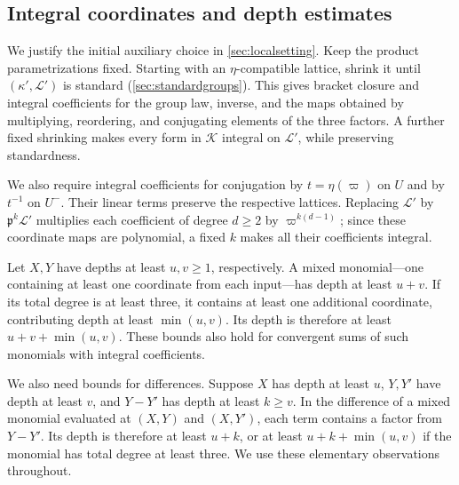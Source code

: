 \documentclass[11pt,reqno]{amsart}
\numberwithin{equation}{section}
\theoremstyle{plain}
\theoremstyle{definition}
\theoremstyle{remark}
\theoremstyle{plain}
\newcommand{\pp}{\mathfrak{p}}   %
\newcommand{\Lat}{\mathcal{L}}   %
\newcommand{\g}{\mathfrak{g}}    %
\newcommand{\etacompat}{$\eta$-compatible}
\begin{document}
\subsection{Integral coordinates and depth estimates}\label{sec:estimates}
We justify the initial auxiliary choice in \cref{sec:localsetting}.
Keep the product parametrizations fixed. Starting with an
\etacompat{} lattice, shrink it until $(\kappa',\Lat')$ is standard
(\cref{sec:standardgroups}). This gives bracket closure and integral
coefficients for the group law, inverse, and the maps obtained by
multiplying, reordering, and conjugating elements of the three factors.
A further fixed shrinking makes every form in $\mathcal K$ integral
on $\Lat'$, while preserving standardness.

We also require integral coefficients for conjugation by
$t=\eta(\varpi)$ on $U$ and by $t^{-1}$ on $U^-$.
Their linear terms preserve the respective lattices.
Replacing $\Lat'$ by $\pp^k\Lat'$ multiplies each coefficient of
degree $d\ge2$ by $\varpi^{k(d-1)}$; since these coordinate maps
are polynomial, a fixed $k$ makes all their coefficients integral.

Let $X,Y$ have depths at least $u,v\ge1$, respectively.
A mixed monomial---one containing at least one coordinate from each
input---has depth at least $u+v$. If its total degree is at least
three, it contains at least one additional coordinate, contributing
depth at least $\min(u,v)$. Its depth is therefore at least
$u+v+\min(u,v)$. These bounds also hold for convergent sums of such
monomials with integral coefficients.

We also need bounds for differences. Suppose $X$ has depth at least
$u$, $Y,Y'$ have depth at least $v$, and $Y-Y'$ has depth at least
$k\ge v$. In the difference of a mixed monomial evaluated at
$(X,Y)$ and $(X,Y')$, each term contains a factor from $Y-Y'$.
Its depth is therefore at least $u+k$, or at least
$u+k+\min(u,v)$ if the monomial has total degree at least three.
We use these elementary observations throughout.
\end{document}
